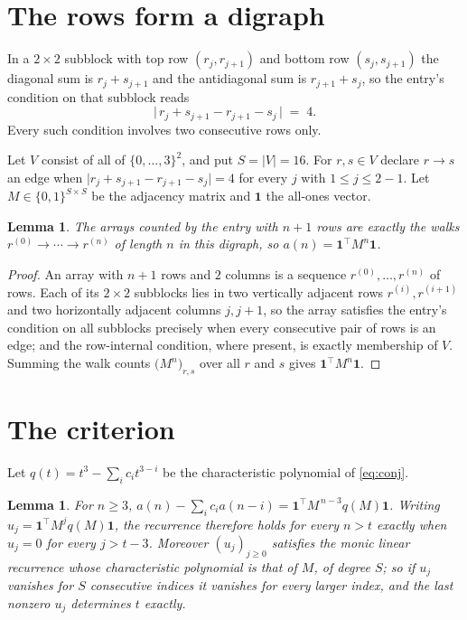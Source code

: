 \documentclass[11pt,a4paper]{article}
\theoremstyle{plain}
\newtheorem{lemma}[theorem]{Lemma}
\theoremstyle{definition}
\begin{document}
\section{The rows form a digraph}

In a $2\times2$ subblock with top row $(r_j,r_{j+1})$ and bottom row $(s_j,s_{j+1})$ the
diagonal sum is $r_j+s_{j+1}$ and the antidiagonal sum is $r_{j+1}+s_j$, so the entry's
condition on that subblock reads
\[
\bigl|\,r_j+s_{j+1}-r_{j+1}-s_j\,\bigr|\;=\;4.
\]
Every such condition involves two consecutive rows only.

Let $V$ consist of all of $\{0,\dots,3\}^{2}$, and put $S=|V|=16$. For $r,s\in V$ declare $r\to s$ an edge
when $\bigl|r_j+s_{j+1}-r_{j+1}-s_j\bigr|=4$ for every $j$ with
$1\le j\le2-1$. Let $M\in\{0,1\}^{S\times S}$ be the adjacency matrix and $\mathbf{1}$
the all-ones vector.

\begin{lemma}\label{lem:walk}
The arrays counted by the entry with $n+1$ rows are exactly the walks
$r^{(0)}\to\cdots\to r^{(n)}$ of length $n$ in this digraph, so
$a(n)=\mathbf{1}^{\!\top}M^{n}\mathbf{1}$.
\end{lemma}

\begin{proof}
An array with $n+1$ rows and $2$ columns is a sequence $r^{(0)},\dots,r^{(n)}$ of
rows. Each of its $2\times2$ subblocks lies in two vertically adjacent rows
$r^{(i)},r^{(i+1)}$ and two horizontally adjacent columns $j,j+1$, so the array satisfies
the entry's condition on all subblocks precisely when every consecutive pair of rows is an
edge; and the row-internal condition, where present, is exactly membership of $V$. Summing
the walk counts $\bigl(M^{n}\bigr)_{r,s}$ over all $r$ and $s$ gives
$\mathbf{1}^{\!\top}M^{n}\mathbf{1}$.
\end{proof}

\section{The criterion}

Let $q(t)=t^{3}-\sum_i c_i t^{3-i}$ be the characteristic polynomial of
\eqref{eq:conj}.

\begin{lemma}\label{lem:crit}
For $n\ge3$,
$a(n)-\sum_i c_i a(n-i)=\mathbf{1}^{\!\top}M^{\,n-3}q(M)\mathbf{1}$. Writing
$u_j=\mathbf{1}^{\!\top}M^{j}q(M)\mathbf{1}$, the recurrence therefore holds for every
$n>t$ exactly when $u_j=0$ for every $j>t-3$. Moreover $(u_j)_{j\ge0}$ satisfies the
monic linear recurrence whose characteristic polynomial is that of $M$, of degree $S$; so
if $u_j$ vanishes for $S$ consecutive indices it vanishes for every larger index, and the
last nonzero $u_j$ determines $t$ exactly.
\end{lemma}
\end{document}
